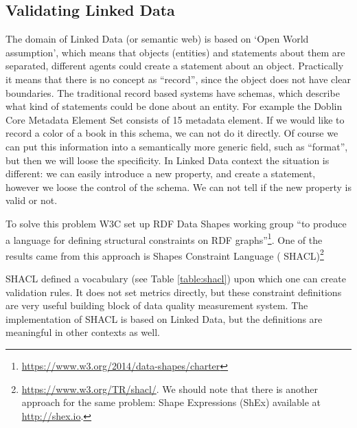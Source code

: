 \subsection{Validating Linked Data}

The domain of Linked Data (or semantic web) is based on `Open World assumption', which means that objects (entities) and statements about them are separated, different agents could create a statement about an object. Practically it means that there is no concept as ``record'', since the object does not have clear boundaries. The traditional record based systems have schemas, which describe what kind of statements could be done about an entity. For example the Doblin Core Metadata Element Set consists of 15 metadata element. If we would like to record a color of a book in this schema, we can not do it directly. Of course we can put this information into a semantically more generic field, such as ``format'', but then we will loose the specificity. In Linked Data context the situation is different: we can easily introduce a new property, and create a statement, however we loose the control of the schema. We can not tell if the new property is valid or not.

To solve this problem W3C set up RDF Data Shapes working group ``to produce a language for defining structural constraints on RDF graphs''\footnote{\url{https://www.w3.org/2014/data-shapes/charter}}. One of the results came from this approach is Shapes Constraint Language ( SHACL)\footnote{\url{https://www.w3.org/TR/shacl/}. We should note that there is another approach for the same problem: Shape Expressions (ShEx) available at \url{http://shex.io}.}

SHACL defined a vocabulary (see Table \ref{table:shacl}) upon which one can create validation rules. It does not set metrics directly, but these constraint definitions are very useful building block of data quality measurement system. The implementation of SHACL is based on Linked Data, but the definitions are meaningful in other contexts as well.

